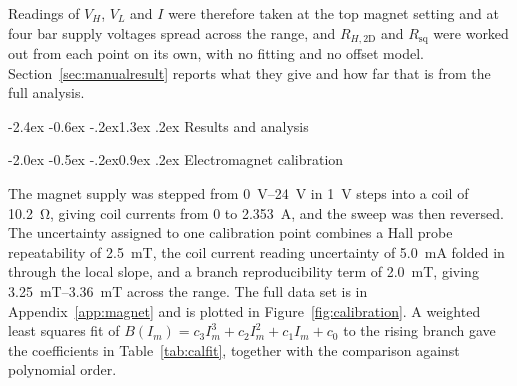 \documentclass[11pt,a4paper]{article}
\makeatletter
\renewcommand\section{\@startsection{section}{1}{\z@}%
  {-2.4ex \@plus -0.6ex \@minus -.2ex}{1.3ex \@plus .2ex}%
  {\normalfont\large\bfseries}}
\renewcommand\subsection{\@startsection{subsection}{2}{\z@}%
  {-2.0ex \@plus -0.5ex \@minus -.2ex}{0.9ex \@plus .2ex}%
  {\normalfont\normalsize\bfseries}}
\newcommand{\Rsq}{R_{\mathrm{sq}}}
\newcommand{\Rhtwod}{R_{H,\mathrm{2D}}}
\makeatother
\begin{document}
Readings of $V_H$, $V_L$ and $I$ were therefore taken at the top magnet setting and at four
bar supply voltages spread across the range, and $\Rhtwod$ and $\Rsq$ were worked out from
each point on its own, with no fitting and no offset model. Section~\ref{sec:manualresult}
reports what they give and how far that is from the full analysis.

\section{Results and analysis}

\subsection{Electromagnet calibration}
\label{sec:calibration}

The magnet supply was stepped from \qtyrange{0}{24}{\volt} in \qty{1}{\volt} steps into a
coil of \qty{10.2}{\ohm}, giving coil currents from \num{0} to \qty{2.353}{\ampere}, and the
sweep was then reversed. The uncertainty assigned to one calibration point combines a Hall
probe repeatability of \qty{2.5}{\milli\tesla}, the coil current reading uncertainty of
\qty{5.0}{\milli\ampere} folded in through the local slope, and a branch reproducibility term
of \qty{2.0}{\milli\tesla}, giving \qtyrange{3.25}{3.36}{\milli\tesla} across the range. The
full data set is in Appendix~\ref{app:magnet} and is plotted in
Figure~\ref{fig:calibration}. A weighted least squares fit of
$B(I_m) = c_3 I_m^3 + c_2 I_m^2 + c_1 I_m + c_0$ to the rising branch gave the coefficients
in Table~\ref{tab:calfit}, together with the comparison against polynomial order.
\end{document}
